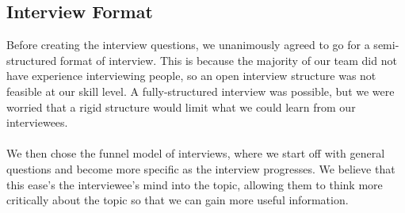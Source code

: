 \documentclass[11pt,onside]{report}
\begin{document}
\subsection{Interview Format}
\begin{description}
Before creating the interview questions, we unanimously agreed to go for a semi-structured format of interview. This is because the majority of our team did not have experience interviewing people, so an open interview structure was not feasible at our skill level. A fully-structured interview was possible, but we were worried that a rigid structure would limit what we could learn from our interviewees. \\ \\

We then chose the funnel model of interviews, where we start off with general questions and become more specific as the interview progresses. We believe that this ease's the interviewee's mind into the topic, allowing them to think more critically about the topic so that we can gain more useful information.
\end{description}
\end{document}
